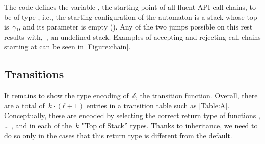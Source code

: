 The code defines the  variable , the starting point
of all fluent API call chains, to be of type , i.e.,
  the starting configuration of the automaton is a stack whose top is~$γ₁$,
  and its  parameter is empty ().
Any of the two jumps possible on this rest results with,~,
  an undefined stack.
Examples of accepting and rejecting call chains starting at 
  can be seen in \cref{Figure:chain}.

\subsection{Transitions}
It remains to show the type encoding of~$δ$,
  the transition function.
Overall, there are a total of~$k·(ℓ+1)$
  entries in a transition table such as \cref{Table:A}.
Conceptually, these are encoded by selecting the correct return
  type of functions , … , and \cc{\$()} in each
  of the~$k$ ‟Top of Stack” types.
Thanks to inheritance, we need to do so only in the cases that this
  return type is different from the default.

